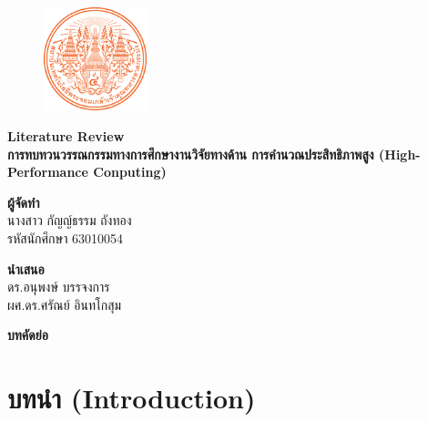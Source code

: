 \documentclass[a4paper,12pt]{extarticle}
\begin{document}
\vspace*{0.5cm}
{\centering
\begin{figure}[h]
    \centering
    \includegraphics[width=3cm]{images/Seal_of_King_Mongkut's_Institute_of_Technology_Ladkrabang.png}
\end{figure}
\fontsize{24pt}{28pt}\selectfont \textbf{Literature Review} \\ \textbf{การทบทวนวรรณกรรมทางการศึกษางานวิจัยทางด้าน การคำนวณประสิทธิภาพสูง (High-Performance Conputing)} \par
\vspace{12pt}
\fontsize{16pt}{24pt}\selectfont \textbf{ผู้จัดทำ} \\ นางสาว กัญญ์ธรรม ถังทอง \\ รหัสนักศึกษา 63010054 \par
\vspace{12pt}
\fontsize{16pt}{24pt}\selectfont \textbf{นำเสนอ} \\ ดร.อนุพงษ์ บรรจงการ \\ ผศ.ดร.ศรัณย์ อินทโกสุม \par
}

\vspace{12pt}
\begin{center}
    {\fontsize{18pt}{20pt}\selectfont
    \textbf{บทคัดย่อ} %
    \par
    }
	\begin{justify}

	\end{justify}
\end{center}
\vspace{12pt}

\newpage

\renewcommand{\contentsname}{\centering สารบัญ}
\tableofcontents
\newpage %

\section{บทนำ (Introduction)}

\newpage

\end{document}
